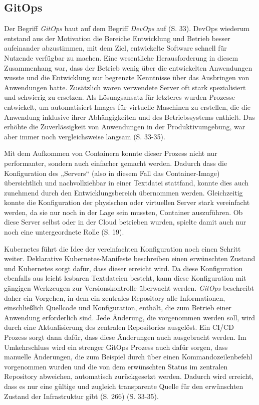 \documentclass[11pt,a4paper]{article}
\begin{document}
\subsection{GitOps}
Der Begriff \emph{GitOps} baut auf dem Begriff \emph{DevOps} auf \cite{cicd_with_kubernetes_devops} (S. 33).
DevOps wiederum entstand aus der Motivation die Bereiche Entwicklung und Betrieb
besser aufeinander abzustimmen, mit dem Ziel, entwickelte Software schnell
für Nutzende verfügbar zu machen. Eine wesentliche Herausforderung in diesem Zusammenhang
war, dass der Betrieb wenig über die entwickelten Anwendungen wusste und
die Entwicklung nur begrenzte Kenntnisse über das Ausbringen von Anwendungen hatte.
Zusätzlich waren verwendete Server oft stark spezialisiert und schwierig zu ersetzen.
Als Lösungsansatz für letzteres wurden Prozesse entwickelt, um automatisiert Images
für virtuelle Maschinen zu erstellen, die die Anwendung inklusive ihrer Abhängigkeiten
und des Betriebssystems enthielt. Das erhöhte die Zuverlässigkeit von
Anwendungen in der Produktivumgebung, war aber immer noch vergleichsweise langsam \cite{cicd_with_kubernetes_devops} (S. 33-35).

Mit dem Aufkommen von Containern konnte dieser Prozess nicht nur performanter, sondern
auch einfacher gemacht werden. Dadurch dass die Konfiguration des „Servers“ (also in diesem
Fall das Container-Image) übersichtlich und nachvollziehbar in einer Textdatei stattfand,
konnte dies auch zunehmend durch den Entwicklungsbereich übernommen werden.
Gleichzeitig konnte die Konfiguration der physischen oder virtuellen Server
stark vereinfacht werden, da sie nur noch in der Lage sein mussten, Container auszuführen.
Ob diese Server selbst oder in der Cloud betrieben wurden, spielte damit auch nur
noch eine untergeordnete Rolle \cite{cicd_with_kubernetes_devops} (S. 19).

Kubernetes führt die Idee der vereinfachten Konfiguration noch einen Schritt weiter.
Deklarative Kubernetes-Manifeste beschreiben einen erwünschten Zustand
und Kubernetes sorgt dafür, dass dieser erreicht wird.
Da diese Konfiguration ebenfalls aus leicht lesbaren Textdateien besteht,
kann diese Konfiguration mit gängigen Werkzeugen zur Versionskontrolle
überwacht werden. \emph{GitOps} beschreibt daher ein Vorgehen,
in dem ein zentrales Repository alle Informationen, einschließlich Quellcode und Konfiguration,
enthält, die zum Betrieb einer Anwendung erforderlich sind.
Jede Änderung, die vorgenommen werden soll, wird durch eine Aktualisierung
des zentralen Repositories ausgelöst. Ein CI/CD Prozess sorgt dann dafür,
dass diese Änderungen auch ausgebracht werden.
Im Umkehrschluss wird ein strenger GitOps Prozess auch dafür sorgen,
dass manuelle Änderungen, die zum Beispiel durch über einen Kommandozeilenbefehl
vorgenommen wurden und die von dem erwünschten Status im zentralen Repository
abweichen, automatisch zurückgesetzt werden.
Dadurch wird erreicht, dass es nur eine gültige und zugleich transparente
Quelle für den erwünschten Zustand der Infrastruktur gibt \cite{domingus2022cloud} (S. 266) \cite{cicd_with_kubernetes_devops} (S. 33-35).
\end{document}

